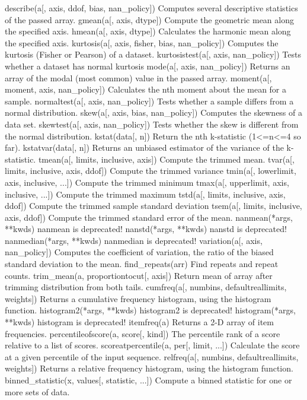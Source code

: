describe(a[, axis, ddof, bias, nan_policy])	Computes several descriptive statistics of the passed array.
gmean(a[, axis, dtype])	Compute the geometric mean along the specified axis.
hmean(a[, axis, dtype])	Calculates the harmonic mean along the specified axis.
kurtosis(a[, axis, fisher, bias, nan_policy])	Computes the kurtosis (Fisher or Pearson) of a dataset.
kurtosistest(a[, axis, nan_policy])	Tests whether a dataset has normal kurtosis
mode(a[, axis, nan_policy])	Returns an array of the modal (most common) value in the passed array.
moment(a[, moment, axis, nan_policy])	Calculates the nth moment about the mean for a sample.
normaltest(a[, axis, nan_policy])	Tests whether a sample differs from a normal distribution.
skew(a[, axis, bias, nan_policy])	Computes the skewness of a data set.
skewtest(a[, axis, nan_policy])	Tests whether the skew is different from the normal distribution.
kstat(data[, n])	Return the nth k-statistic (1<=n<=4 so far).
kstatvar(data[, n])	Returns an unbiased estimator of the variance of the k-statistic.
tmean(a[, limits, inclusive, axis])	Compute the trimmed mean.
tvar(a[, limits, inclusive, axis, ddof])	Compute the trimmed variance
tmin(a[, lowerlimit, axis, inclusive, ...])	Compute the trimmed minimum
tmax(a[, upperlimit, axis, inclusive, ...])	Compute the trimmed maximum
tstd(a[, limits, inclusive, axis, ddof])	Compute the trimmed sample standard deviation
tsem(a[, limits, inclusive, axis, ddof])	Compute the trimmed standard error of the mean.
nanmean(*args, **kwds)	nanmean is deprecated!
nanstd(*args, **kwds)	nanstd is deprecated!
nanmedian(*args, **kwds)	nanmedian is deprecated!
variation(a[, axis, nan_policy])	Computes the coefficient of variation, the ratio of the biased standard deviation to the mean.
find_repeats(arr)	Find repeats and repeat counts.
trim_mean(a, proportiontocut[, axis])	Return mean of array after trimming distribution from both tails.
cumfreq(a[, numbins, defaultreallimits, weights])	Returns a cumulative frequency histogram, using the histogram function.
histogram2(*args, **kwds)	histogram2 is deprecated!
histogram(*args, **kwds)	histogram is deprecated!
itemfreq(a)	Returns a 2-D array of item frequencies.
percentileofscore(a, score[, kind])	The percentile rank of a score relative to a list of scores.
scoreatpercentile(a, per[, limit, ...])	Calculate the score at a given percentile of the input sequence.
relfreq(a[, numbins, defaultreallimits, weights])	Returns a relative frequency histogram, using the histogram function.
binned_statistic(x, values[, statistic, ...])	Compute a binned statistic for one or more sets of data.
